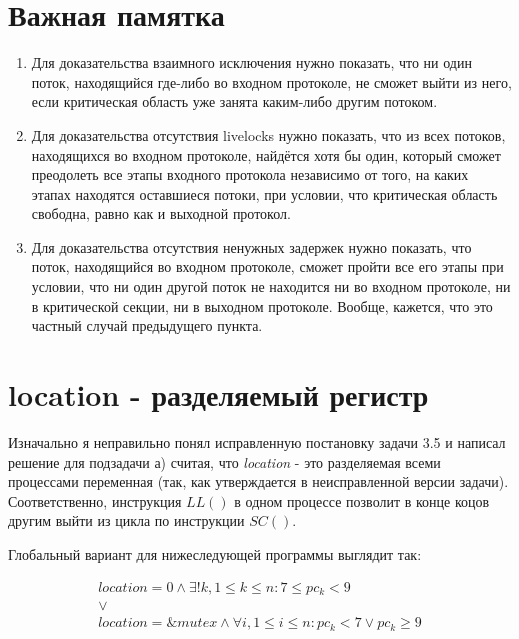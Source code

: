 \documentclass{article}
\author{Виталий Кирсанов}
\begin{document}
\section{Важная памятка}

\begin{enumerate}
\item
Для доказательства взаимного исключения нужно показать, что ни один поток, находящийся где-либо во входном протоколе, не сможет
выйти из него, если критическая область уже занята каким-либо другим потоком.

\item
Для доказательства отсутствия livelocks нужно показать, что из всех потоков, находящихся во входном протоколе, найдётся хотя бы
один, который сможет преодолеть все этапы входного протокола независимо от того, на каких этапах находятся оставшиеся потоки, при
условии, что критическая область свободна, равно как и выходной протокол.

\item
Для доказательства отсутствия ненужных задержек нужно показать, что поток, находящийся во входном протоколе, сможет пройти все его
этапы при условии, что ни один другой поток не находится ни во входном протоколе, ни в критической секции, ни в выходном
протоколе. Вообще, кажется, что это частный случай предыдущего пункта.
\end{enumerate}

\section{location - разделяемый регистр}

Изначально я неправильно понял исправленную постановку задачи 3.5 и написал решение для подзадачи а) считая, что \emph{location} -
это разделяемая всеми процессами переменная (так, как утверждается в неисправленной версии задачи). Соответственно, инструкция $
LL() $ в одном процессе позволит в конце коцов другим выйти из цикла по инструкции $ SC() $.

Глобальный вариант для нижеследующей программы выглядит так:

\begin{displaymath}
\begin{matrix}
location = 0 \land \exists ! k, 1 \leq k \leq n : 7 \leq pc_k < 9 \\
\lor \\
location = \&mutex \land \forall i, 1 \leq i \leq n : pc_k < 7 \lor pc_k \geq 9
\end{matrix}
\end{displaymath}
\end{document}
